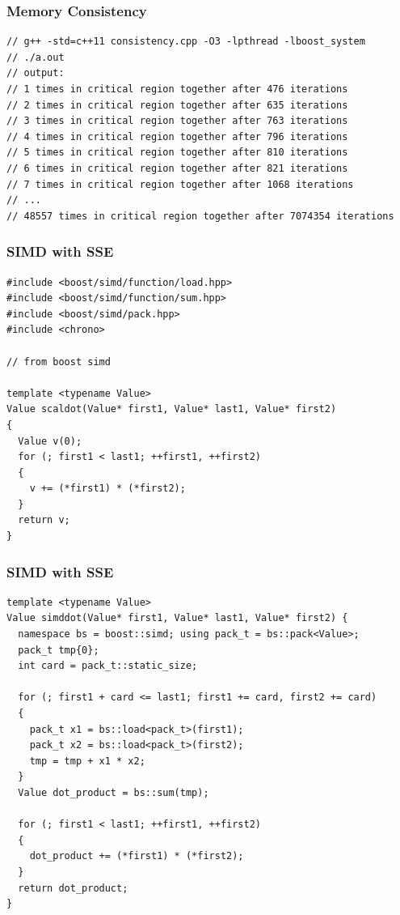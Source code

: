 \documentclass{beamer}
\begin{document}
\begin{frame}[fragile]
\frametitle{Memory Consistency}
\scriptsize
\begin{lstlisting}
// g++ -std=c++11 consistency.cpp -O3 -lpthread -lboost_system
// ./a.out
// output:
// 1 times in critical region together after 476 iterations
// 2 times in critical region together after 635 iterations
// 3 times in critical region together after 763 iterations
// 4 times in critical region together after 796 iterations
// 5 times in critical region together after 810 iterations
// 6 times in critical region together after 821 iterations
// 7 times in critical region together after 1068 iterations
// ...
// 48557 times in critical region together after 7074354 iterations
\end{lstlisting}

\end{frame}

\begin{frame}[fragile]
\frametitle{SIMD with SSE}
\scriptsize
\begin{lstlisting}[linebackgroundcolor={\lstcolorlines{14}}]
#include <boost/simd/function/load.hpp>
#include <boost/simd/function/sum.hpp>
#include <boost/simd/pack.hpp>
#include <chrono>

// from boost simd

template <typename Value>
Value scaldot(Value* first1, Value* last1, Value* first2)
{
  Value v(0);
  for (; first1 < last1; ++first1, ++first2)
  {
    v += (*first1) * (*first2);
  }
  return v;
}
\end{lstlisting}

\end{frame}

\begin{frame}[fragile]
\frametitle{SIMD with SSE}
\scriptsize
\begin{lstlisting}[linebackgroundcolor={\lstcolorlines{7,8,9,10,11,12}}]
template <typename Value>
Value simddot(Value* first1, Value* last1, Value* first2) {
  namespace bs = boost::simd; using pack_t = bs::pack<Value>;
  pack_t tmp{0};
  int card = pack_t::static_size;

  for (; first1 + card <= last1; first1 += card, first2 += card)
  {
    pack_t x1 = bs::load<pack_t>(first1);
    pack_t x2 = bs::load<pack_t>(first2);
    tmp = tmp + x1 * x2;
  }
  Value dot_product = bs::sum(tmp);

  for (; first1 < last1; ++first1, ++first2)
  {
    dot_product += (*first1) * (*first2);
  }
  return dot_product;
}
\end{lstlisting}

\end{frame}
\end{document}
